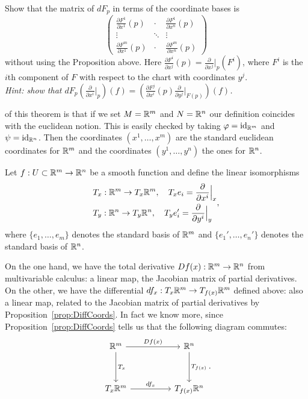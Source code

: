\begin{exercise}
  Show that the matrix of $d F_p$ in terms of the coordinate bases is
  \begin{equation}
    \begin{pmatrix}
      \frac{\partial F^1}{\partial x^1} (p) & \cdot  & \frac{\partial F^1}{\partial x^n} (p) \\
      \vdots                                & \ddots & \vdots                                \\
      \frac{\partial F^m}{\partial x^1} (p) & \cdot  & \frac{\partial F^m}{\partial x^n} (p)
    \end{pmatrix}
  \end{equation}
  without using the Proposition above. Here $\frac{\partial F^i}{\partial x^j} (p) = \frac{\partial}{\partial x^j}\big|_p (F^i)$, where $F^i$ is the $i$th component of $F$ with respect to the chart with coordinates $y^j$.\\
  \textit{\small Hint: show that $d F_p \left(\frac{\partial}{\partial x^i}\big|_p\right) (f) = \left(\frac{\partial F^j}{\partial x^i} (p) \frac{\partial}{\partial y^j}\big|_{F(p)}\right) (f)$.}
\end{exercise}

 of this theorem is that if we set $M=\mathbb{R}^m$ and $N=\mathbb{R}^n$ our definition coincides with the euclidean notion.
This is easily checked by taking $\varphi = \operatorname{id}_{\mathbb{R}^m}$ and $\psi=\operatorname{id}_{\mathbb{R}^n}$.
Then the coordinates $(x^1,\ldots,x^m)$ are the standard euclidean coordinates for $\mathbb{R}^m$ and the coordinates $(y^1,\ldots,y^n)$ the ones for $\mathbb{R}^n$.

Let $f:U\subset\mathbb{R}^m\to\mathbb{R}^n$ be a smooth function and define the linear isomorphisms
\begin{equation}\label{def:lin_iso_Tp}
  \begin{split}
    &T_x : \mathbb{R}^m \to T_x\mathbb{R}^m,\quad T_x e_i = \frac{\partial}{\partial x^i}\Big|_x\\
    &T_y : \mathbb{R}^n \to T_y\mathbb{R}^n,\quad T_y e_i' = \frac{\partial}{\partial y^i}\Big|_y
  \end{split},
\end{equation}
where $\{e_1,\ldots,e_m\}$ denotes the standard basis of $\mathbb{R}^m$ and $\{e_1',\ldots,e_n'\}$ denotes the standard basis of $\mathbb{R}^n$.

On the one hand, we have the total derivative $Df(x):\mathbb{R}^m\to\mathbb{R}^n$ from multivariable calculus: a linear map, the Jacobian matrix of partial derivatives.
On the other, we have the differential $df_x : T_x \mathbb{R}^m \to T_{f(x)}\mathbb{R}^m$ defined above: also a linear map, related to the Jacobian matrix of partial derivatives by Proposition~\ref{prop:DiffCoords}.
In fact we know more, since Proposition~\ref{prop:DiffCoords} tells us that the following diagram commutes:
\begin{equation}
  \begin{tikzcd}[row sep=huge, column sep=huge]
    \R^m \arrow[r, "Df(x)"] \arrow[d, "T_x"]
    & \R^n \arrow[d, "T_{f(x)}"] \\
    T_x\R^m \arrow[r, "df_x"]
    & T_{f(x)}\R^n
  \end{tikzcd}.
\end{equation}

